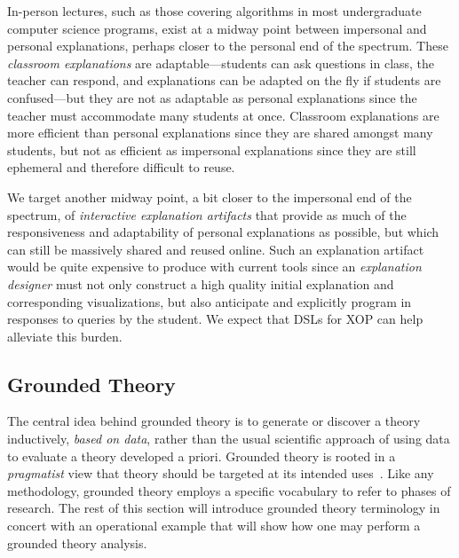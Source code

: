 \documentclass[sigconf]{acmart}
\begin{document}
In-person lectures, such as those covering algorithms in most undergraduate
computer science programs, exist at a midway point between impersonal and
personal explanations, perhaps closer to the personal end of the spectrum.
These \emph{classroom explanations} are adaptable---students can ask questions
in class, the teacher can respond, and explanations can be adapted on the fly
if students are confused---but they are not as adaptable as personal
explanations since the teacher must accommodate many students at once.
Classroom explanations are more efficient than personal explanations since they
are shared amongst many students, but not as efficient as impersonal
explanations since they are still ephemeral and therefore difficult to reuse.


We target another midway point, a bit closer to the impersonal end of the
spectrum, of \emph{interactive explanation artifacts} that provide as much of
the responsiveness and adaptability of personal explanations as possible, but
which can still be massively shared and reused online. Such an explanation
artifact would be quite expensive to produce with current tools since an
\emph{explanation designer} must not only construct a high quality initial
explanation and corresponding visualizations, but also anticipate and
explicitly program in responses to queries by the student.
%
We expect that DSLs for XOP can help alleviate this burden.

\subsection{Grounded Theory}
\label{sec:back:gt}

The central idea behind grounded theory is to generate or discover a theory
inductively, \emph{based on data}, rather than the usual scientific approach of
using data to evaluate a theory developed a priori. 
%
Grounded theory is rooted in a \emph{pragmatist} view that theory should be
targeted at its intended uses~\cite{Strauss67discoveryof}.
%
%
%
Like any methodology, grounded theory employs a specific vocabulary to refer to
phases of research. The rest of this section will introduce grounded theory
terminology in concert with an operational example that will show how one may
perform a grounded theory analysis.
\end{document}
